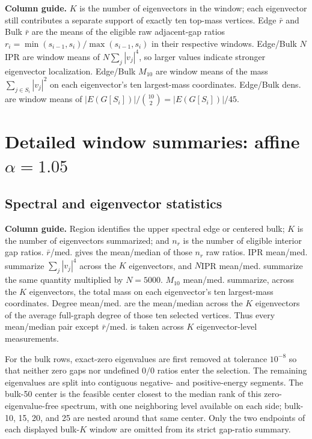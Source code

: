 \documentclass[10pt,letterpaper]{article}
\begin{document}
\textbf{Column guide.} $K$ is the number of eigenvectors in the window; each eigenvector still
contributes a separate support of exactly ten top-mass vertices. Edge $\bar r$ and Bulk $\bar r$ are
the means of the eligible raw adjacent-gap ratios
$r_i=\min(s_{i-1},s_i)/\max(s_{i-1},s_i)$ in their respective windows. Edge/Bulk $N$IPR are window
means of $N\sum_j|v_j|^4$, so larger values indicate stronger eigenvector localization. Edge/Bulk
$M_{10}$ are window means of the mass $\sum_{j\in S_i}|v_j|^2$ on each eigenvector's ten largest-mass
coordinates. Edge/Bulk dens. are window means of $|E(G[S_i])|/\binom{10}{2}=|E(G[S_i])|/45$.
\begingroup
\section{Detailed window summaries: affine $\alpha=1.05$}
\subsection{Spectral and eigenvector statistics}
\textbf{Column guide.} Region identifies the upper spectral edge or centered bulk; $K$ is the
number of eigenvectors summarized; and $n_r$ is the number of eligible interior gap ratios.
$\bar r$/med. gives the mean/median of those $n_r$ raw ratios. IPR mean/med. summarize
$\sum_j|v_j|^4$ across the $K$ eigenvectors, and $N$IPR mean/med. summarize the same quantity
multiplied by $N=5000$. $M_{10}$ mean/med. summarize, across the $K$ eigenvectors, the total mass
on each eigenvector's ten largest-mass coordinates. Degree mean/med. are the mean/median across
the $K$ eigenvectors of the average full-graph degree of those ten selected vertices. Thus every
mean/median pair except $\bar r$/med. is taken across $K$ eigenvector-level measurements.

For the bulk rows, exact-zero eigenvalues are first removed at tolerance $10^{-8}$ so that neither
zero gaps nor undefined $0/0$ ratios enter the selection. The remaining eigenvalues are split into
contiguous negative- and positive-energy segments. The bulk-50 center is the feasible center closest
to the median rank of this zero-eigenvalue-free spectrum, with one neighboring level available on
each side; bulk-10, 15, 20, and 25 are nested around that same center. Only the two endpoints of
each displayed bulk-$K$ window are omitted from its strict gap-ratio summary.
\end{document}
